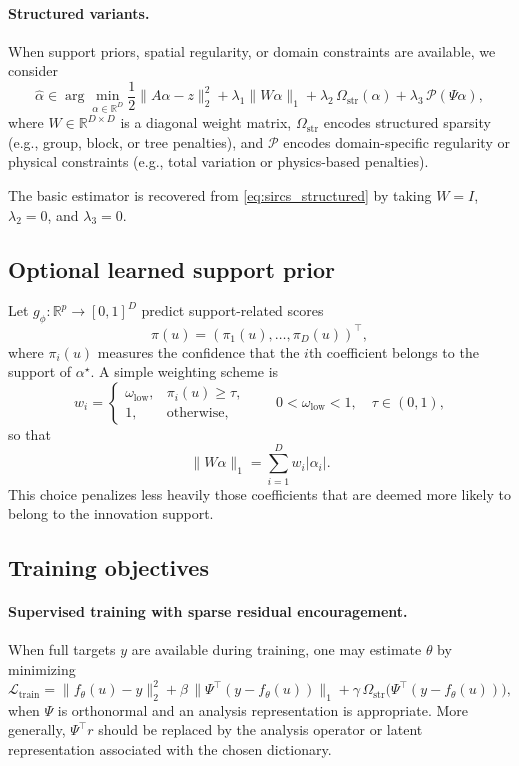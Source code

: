 \paragraph{Structured variants.}
When support priors, spatial regularity, or domain constraints are available, we consider
\begin{equation}
  \hat{\alpha}
  \in
  \arg\min_{\alpha \in \mathbb{R}^D}
  \frac{1}{2}\|A\alpha - z\|_2^2
  + \lambda_1 \|W\alpha\|_1
  + \lambda_2 \,\Omega_{\mathrm{str}}(\alpha)
  + \lambda_3 \,\mathcal{P}(\Psi\alpha),
  \label{eq:sircs_structured}
\end{equation}
where $W \in \mathbb{R}^{D \times D}$ is a diagonal weight matrix,
$\Omega_{\mathrm{str}}$ encodes structured sparsity
(e.g., group, block, or tree penalties), and $\mathcal{P}$ encodes
domain-specific regularity or physical constraints
(e.g., total variation or physics-based penalties).

The basic estimator is recovered from \eqref{eq:sircs_structured} by taking
$W = I$, $\lambda_2 = 0$, and $\lambda_3 = 0$.

\subsection{Optional learned support prior}
Let $g_\phi : \mathbb{R}^p \to [0,1]^D$ predict support-related scores
\[
  \pi(u) = (\pi_1(u),\dots,\pi_D(u))^\top,
\]
where $\pi_i(u)$ measures the confidence that the $i$th coefficient belongs to the support of $\alpha^\star$.
A simple weighting scheme is
\begin{equation}
  w_i =
  \begin{cases}
    \omega_{\mathrm{low}}, & \pi_i(u) \ge \tau, \\
    1, & \text{otherwise},
  \end{cases}
  \qquad
  0 < \omega_{\mathrm{low}} < 1,
  \quad
  \tau \in (0,1),
\end{equation}
so that
\[
  \|W\alpha\|_1 = \sum_{i=1}^D w_i |\alpha_i|.
\]
This choice penalizes less heavily those coefficients that are deemed more likely to belong to the innovation support.

\subsection{Training objectives}
\paragraph{Supervised training with sparse residual encouragement.}
When full targets $y$ are available during training, one may estimate $\theta$ by minimizing
\begin{equation}
  \mathcal{L}_{\mathrm{train}}
  =
  \|f_\theta(u) - y\|_2^2
  + \beta \,\|\Psi^\top (y - f_\theta(u))\|_1
  + \gamma \,\Omega_{\mathrm{str}}\!\bigl(\Psi^\top (y - f_\theta(u))\bigr),
\end{equation}
when $\Psi$ is orthonormal and an analysis representation is appropriate.
More generally, $\Psi^\top r$ should be replaced by the analysis operator or latent representation
associated with the chosen dictionary.

